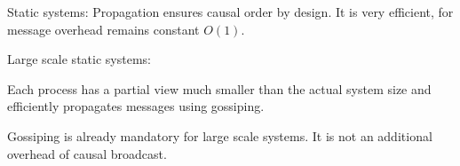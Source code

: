 \documentclass[10pt, xcolor={usenames, dvipsnames}]{beamer}
\newcommand{\cmark}{\ding{51}}
\newcommand{\YES}[1]{\textcolor{green}{#1}}
\begin{document}
\begin{frame}{Static systems: \YES{\cmark}}
  Propagation ensures causal order by design. It is very efficient, for message
  overhead remains constant $O(1)$.

  \vspace{2em}

\end{frame}

\begin{frame}{Large scale static systems: \YES{\cmark}}

  Each process has a partial view much smaller than the actual system size and
  efficiently propagates messages using gossiping.

  \begin{center}
    
  \end{center}

  Gossiping is already mandatory for large scale systems. It is not an
  additional overhead of causal broadcast.

\end{frame}
\end{document}
